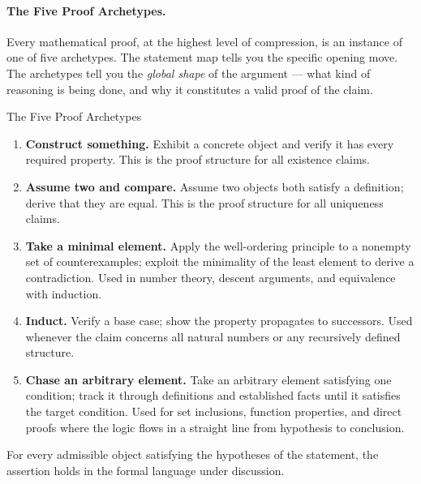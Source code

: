 \paragraph{The Five Proof Archetypes.}

Every mathematical proof, at the highest level of compression, is an
instance of one of five archetypes. The statement map tells you the
specific opening move. The archetypes tell you the \emph{global shape}
of the argument --- what kind of reasoning is being done, and why it
constitutes a valid proof of the claim.

\begin{propositionbox}{The Five Proof Archetypes}
\begin{enumerate}
  \item \textbf{Construct something.}
    Exhibit a concrete object and verify it has every required property.
    This is the proof structure for all existence claims.

  \item \textbf{Assume two and compare.}
    Assume two objects both satisfy a definition; derive that they are
    equal. This is the proof structure for all uniqueness claims.

  \item \textbf{Take a minimal element.}
    Apply the well-ordering principle to a nonempty set of counterexamples;
    exploit the minimality of the least element to derive a contradiction.
    Used in number theory, descent arguments, and equivalence with induction.

  \item \textbf{Induct.}
    Verify a base case; show the property propagates to successors.
    Used whenever the claim concerns all natural numbers or any
    recursively defined structure.

  \item \textbf{Chase an arbitrary element.}
    Take an arbitrary element satisfying one condition; track it through
    definitions and established facts until it satisfies the target condition.
    Used for set inclusions, function properties, and direct proofs where
    the logic flows in a straight line from hypothesis to conclusion.
\end{enumerate}
\end{propositionbox}
\begin{remark*}
For every admissible object satisfying the hypotheses of the statement, the
assertion holds in the formal language under discussion.
\end{remark*}

